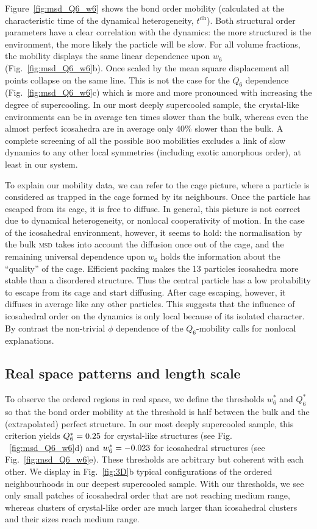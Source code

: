 Figure~\ref{fig:msd_Q6_w6} shows the bond order mobility (calculated at the characteristic time of the dynamical heterogeneity, $t^\text{dh}$). Both structural order parameters have a clear correlation with the dynamics: the more structured is the environment, the more likely the particle will be slow. For all volume fractions, the mobility displays the same linear dependence upon $w_6$ (Fig.~\ref{fig:msd_Q6_w6}b). Once scaled by the mean square displacement all points collapse on the same line. This is not the case for the $Q_6$ dependence (Fig.~\ref{fig:msd_Q6_w6}c) which is more and more pronounced with increasing the degree of supercooling. In our most deeply supercooled sample, the crystal-like environments can be in average ten times slower than the bulk, whereas even the almost perfect icosahedra are in average only $40\%$ slower than the bulk. A complete screening of all the possible \textsc{boo} mobilities excludes a link of slow dynamics to any other local symmetries (including exotic amorphous order), at least in our system.

To explain our mobility data, we can refer to the cage picture, where a particle is considered as trapped in the cage formed by its neighbours. Once the particle has escaped from its cage, it is free to diffuse. In general, this picture is not correct due to dynamical heterogeneity, or nonlocal cooperativity of motion. In the case of the icosahedral environment, however, it seems to hold: the normalisation by the bulk \textsc{msd} takes into account the diffusion once out of the cage, and the remaining universal dependence upon $w_6$ holds the information about the ``quality'' of the cage. Efficient packing makes the 13 particles icosahedra more stable than a disordered structure. Thus the central particle has a low probability to escape from its cage and start diffusing. After cage escaping, however, it diffuses in average like any other particles. This suggests that the influence of icosahedral order on the dynamics is only local because of its isolated character. By contrast the non-trivial $\phi$ dependence of the $Q_6$-mobility calls for nonlocal explanations.

\subsection*{Real space patterns and length scale}
To observe the ordered regions in real space, we define the thresholds $w_6^*$ and $Q_6^*$ so that the bond order mobility at the threshold is half between the bulk and the (extrapolated) perfect structure. In our most deeply supercooled sample, this criterion yields $Q_6^* = 0.25$ for crystal-like structures (see Fig. ~\ref{fig:msd_Q6_w6}d) and $w_6^* = -0.023$ for icosahedral structures (see Fig.~\ref{fig:msd_Q6_w6}e). These thresholds are arbitrary but coherent with each other. We display in Fig.~\ref{fig:3D}b typical configurations of the ordered neighbourhoods in our deepest supercooled sample. With our thresholds, we see only small patches of icosahedral order that are not reaching medium range, whereas clusters of crystal-like order are much larger than icosahedral clusters and their sizes reach medium range. 

